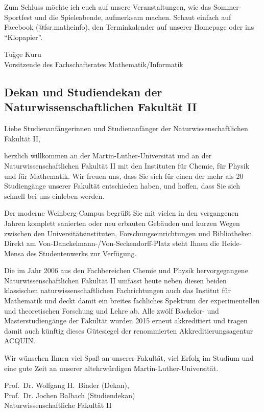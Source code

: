 Zum Schluss möchte ich euch 
auf unsere Veranstaltungen,
wie das Sommer-Sportfest und die Spieleabende,
aufmerksam machen.
Schaut einfach auf Facebook (@fsr.matheinfo),
den Terminkalender auf unserer Homepage
oder ins "`Klopapier"'.

Tuğçe Kuru \\
Vorsitzende des Fachschaftsrates Mathematik/Informatik


\subsection*{Dekan und Studiendekan der Naturwissenschaftlichen Fakultät II}

Liebe Studienanfängerinnen und Studienanfänger der Naturwissenschaftlichen
Fakultät II,

herzlich willkommen an der Martin-Luther-Universität und an der
Naturwissenschaftlichen Fakultät II mit den Instituten für Chemie, für Physik
und für Mathematik. Wir freuen uns, dass Sie sich für einen der mehr als 20
Studiengänge unserer Fakultät entschieden haben, und hoffen, dass Sie sich
schnell bei uns einleben werden.

Der moderne Weinberg-Campus begrüßt Sie mit vielen in den vergangenen Jahren
komplett sanierten oder neu erbauten Gebäuden und kurzen Wegen zwischen den
Universitätsinstituten, Forschungseinrichtungen und Bibliotheken. Direkt am
Von-Danckelmann-/Von-Seckendorff-Platz steht Ihnen die Heide-Mensa des
Studentenwerks zur Verfügung.

Die im Jahr 2006 aus den Fachbereichen Chemie und Physik hervorgegangene
Naturwissenschaftlichen Fakultät II umfasst heute neben diesen beiden
klassischen naturwissenschaftlichen Fachrichtungen auch das Institut für
Mathematik und deckt damit ein breites fachliches Spektrum der experimentellen
und theoretischen Forschung und Lehre ab. Alle zwölf Bachelor- und
Masterstudiengänge der Fakultät wurden 2015 erneut
akkreditiert und tragen damit auch künftig dieses Gütesiegel der renommierten
Akkreditierungsagentur ACQUIN.

Wir wünschen Ihnen viel Spaß an unserer Fakultät, viel Erfolg im Studium und
eine gute Zeit an unserer altehrwürdigen Martin-Luther-Universität.

Prof.~Dr. Wolfgang H.~Binder (Dekan), \\
Prof.~Dr. Jochen Balbach (Studiendekan) \\
Naturwissenschaftliche Fakultät II 

\newpage

